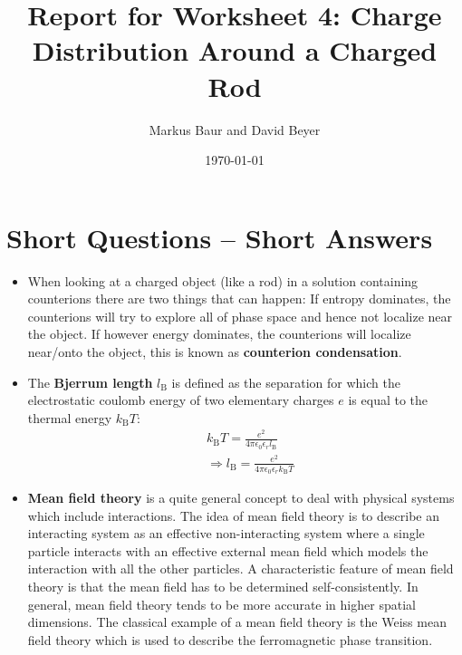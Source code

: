 \documentclass[a4paper,10pt,bibtotoc]{scrartcl}
\begin{document}
\titlehead{Simulation Methods in Physics II \hfill SS 2020}
\title{Report for Worksheet 4: Charge Distribution Around a Charged Rod}
\author{Markus Baur and David Beyer}
\date{\today}
\maketitle

\tableofcontents

\section{Short Questions -- Short Answers}
\begin{itemize}
 \item When looking at a charged object (like a rod) in a solution containing counterions there are two things that can happen: If entropy dominates, the counterions will try to explore all of phase space and hence not localize near the object. If however energy dominates, the counterions will localize near/onto the object, this is known as \textbf{counterion condensation}.
 \item The \textbf{Bjerrum length} $l_\mathrm{B}$ is defined as the separation for which the electrostatic coulomb energy of two elementary charges $e$ is equal to the thermal energy $k_\mathrm{B}T$:
\begin{align}
&k_\mathrm{B}T = \frac{e^2}{4\pi\epsilon_0\epsilon_r l_\mathrm{B}}\\
&\Rightarrow l_\mathrm{B} = \frac{e^2}{4\pi\epsilon_0\epsilon_r k_\mathrm{B}T}
\end{align}

 \item \textbf{Mean field theory} is a quite general concept to deal with physical systems which include interactions. The idea of mean field theory is to describe an interacting system as an effective non-interacting system where a single particle interacts with an effective external mean field which models the interaction with all the other particles. A characteristic feature of mean field theory is that the mean field has to be determined self-consistently. In general, mean field theory tends to be more accurate in higher spatial dimensions. The classical example of a mean field theory is the Weiss mean field theory which is used to describe the ferromagnetic phase transition.
\end{itemize}
\end{document}

